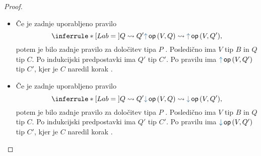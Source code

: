 \begin{proof}
\begin{itemize}
		\item Če je zadnje uporabljeno pravilo
		$$
		\coopinfer{}{
			Q \reduces Q'
		}{
			\tmopout{op}{V}{Q}  \reduces \tmopout{op}{V}{Q'}
		},$$
		potem je bilo zadnje pravilo za določitev tipa $P$ .
		Posledično ima $V$ tip $B$ in $Q$ tip $C$.
		Po indukcijski predpostavki ima $Q'$ tip $C'$.
		Po pravilu  ima $\tmopout{op}{V}{Q'}$ tip $C'$, kjer je $C$ naredil korak .
		
		\item Če je zadnje uporabljeno pravilo
		$$
		\coopinfer{}{
			Q \reduces Q'
		}{
			\tmopin{op}{V}{Q}  \reduces \tmopin{op}{V}{Q'}
		},$$
		potem je bilo zadnje pravilo za določitev tipa $P$ .
		Posledično ima $V$ tip $B$ in $Q$ tip $C$.
		Po indukcijski predpostavki ima $Q'$ tip $C'$.
		Po pravilu  ima $\tmopin{op}{V}{Q'}$ tip $C'$, kjer je $C$ naredil korak .
	\end{itemize}

\end{proof}


